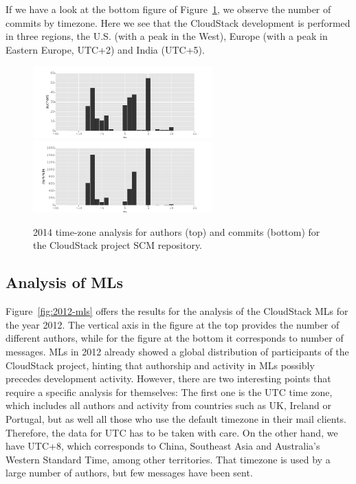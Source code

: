 \documentclass{sig-alternate-05-2015}
\begin{document}
If we have a look at the bottom figure of Figure~\ref{fig:2014-scm}, we observe
the number of commits by timezone. Here we see that the CloudStack development
is performed in three regions, the U.S. (with a peak in the West), Europe (with
a peak in Eastern Europe, UTC+2) and India (UTC+5).


\begin{figure}[!h]
\centering
\includegraphics[width=6.9cm]{figs/cloudstack/tz-scm-authors-2014.pdf}
\includegraphics[width=6.9cm]{figs/cloudstack/tz-scm-commits-2014.pdf}
\caption{2014 time-zone analysis for authors (top) and commits (bottom) for
the CloudStack project SCM repository.}
\label{fig:2014-scm}
\end{figure}


\subsection{Analysis of MLs}

Figure~\ref{fig:2012-mls} offers the results for the analysis of the
CloudStack MLs for the year 2012. The vertical axis in the figure
at the top provides the number of different authors, while for the figure
at the bottom it corresponds to number of messages. MLs in 2012 already showed a global distribution
of participants of the CloudStack project, hinting that authorship and activity
in MLs possibly precedes development activity. However, there are
two interesting points that require a specific analysis for themselves: The first
one is the UTC time zone, which includes all authors and activity from countries
such as UK, Ireland or Portugal, but as well all those who use the default
timezone in their mail clients. Therefore, the data for UTC has to be taken 
with care. On the other hand, we have UTC+8, which corresponds to China,
Southeast Asia and Australia's Western Standard Time, among other territories.
That timezone is used by a large number of authors, but few messages have been
sent.
\end{document}
